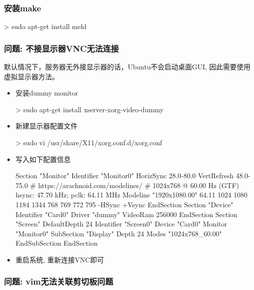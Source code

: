 \subsubsection{安装make}
\begin{commandbox}
 > sudo apt-get install meld
\end{commandbox}

\subsubsection{问题: 不接显示器VNC无法连接}
默认情况下，服务器无外接显示器的话，Ubuntu不会启动桌面GUI, 因此需要使用虚拟显示器方法。
\begin{itemize}
\item 安装dummy monitor
\begin{commandbox}
 > sudo apt-get install xserver-xorg-video-dummy
\end{commandbox}

\item 新建显示器配置文件
\begin{commandbox}
 > sudo vi /usr/share/X11/xorg.conf.d/xorg.conf
\end{commandbox}

\item 写入如下配置信息
\begin{messagebox}
Section "Monitor"
  Identifier "Monitor0"
  HorizSync 28.0-80.0
  VertRefresh 48.0-75.0
  # https://arachnoid.com/modelines/
  # 1024x768 @ 60.00 Hz (GTF) hsync: 47.70 kHz; pclk: 64.11 MHz
  Modeline "1920x1080.00" 64.11 1024 1080 1184 1344 768 769 772 795 -HSync +Vsync
EndSection
Section "Device"
  Identifier "Card0"
  Driver "dummy"
  VideoRam 256000
EndSection
Section "Screen"
  DefaultDepth 24
  Identifier "Screen0"
  Device "Card0"
  Monitor "Monitor0"
  SubSection "Display"
    Depth 24
    Modes "1024x768_60.00"
  EndSubSection
EndSection
\end{messagebox}

\item 重启系统, 重新连接VNC即可

\end{itemize}

\subsubsection{问题: vim无法关联剪切板问题}

